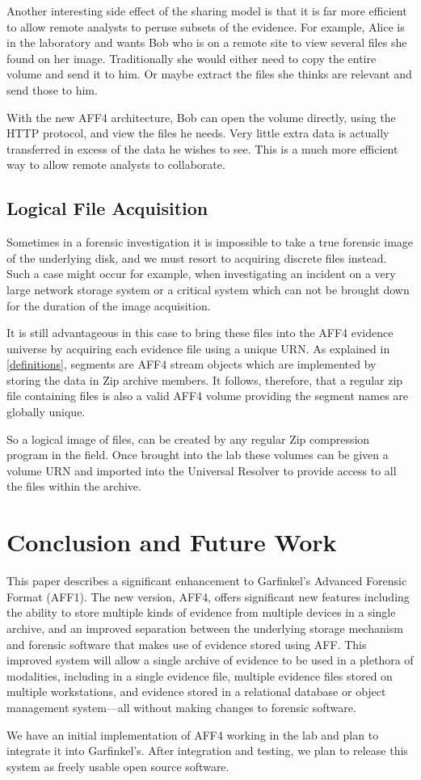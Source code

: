 \documentclass[10pt, conference]{IEEEtran}
\begin{document}
Another interesting side effect of the sharing model is that it is far
more efficient to allow remote analysts to peruse subsets of the
evidence. For example, Alice is in the laboratory and wants Bob who is
on a remote site to view several files she found on her
image. Traditionally she would either need to copy the entire volume
and send it to him. Or maybe extract the files she thinks are relevant
and send those to him.

With the new AFF4 architecture, Bob can open the volume directly,
using the HTTP protocol, and view the files he needs. Very little
extra data is actually transferred in excess of the data he wishes to
see. This is a much more efficient way to allow remote analysts to
collaborate.

\subsection{Logical File Acquisition}
Sometimes in a forensic investigation it is impossible to take a true
forensic image of the underlying disk, and we must resort to acquiring
discrete files instead. Such a case might occur for example, when
investigating an incident on a very large network storage system or a
critical system which can not be brought down for the duration of the
image acquisition.

It is still advantageous in this case to bring these files into the
AFF4 evidence universe by acquiring each evidence file using a unique
URN. As explained in \ref{definitions}, segments are AFF4 stream
objects which are implemented by storing the data in Zip archive
members. It follows, therefore, that a regular zip file containing
files is also a valid AFF4 volume providing the segment names are
globally unique.

So a logical image of files, can be created by any regular Zip
compression program in the field. Once brought into the lab these
volumes can be given a volume URN and imported into the Universal
Resolver to provide access to all the files within the archive.

\section{Conclusion and Future Work}

This paper describes a significant enhancement to Garfinkel's Advanced
Forensic Format (AFF1). The new version, AFF4, offers significant new
features including the ability to store multiple kinds of evidence
from multiple devices in a single archive, and an improved separation
between the underlying storage mechanism and forensic software that
makes use of evidence stored using AFF. This improved system will
allow a single archive of evidence to be used in a plethora of
modalities, including in a single evidence file, multiple evidence
files stored on multiple workstations, and evidence stored in a
relational database or object management system---all without making
changes to forensic software.

We have an initial implementation of AFF4 working in the lab and plan
to integrate it into Garfinkel's. After integration and testing, we
plan to release this system as freely usable open source software.



\end{document}
